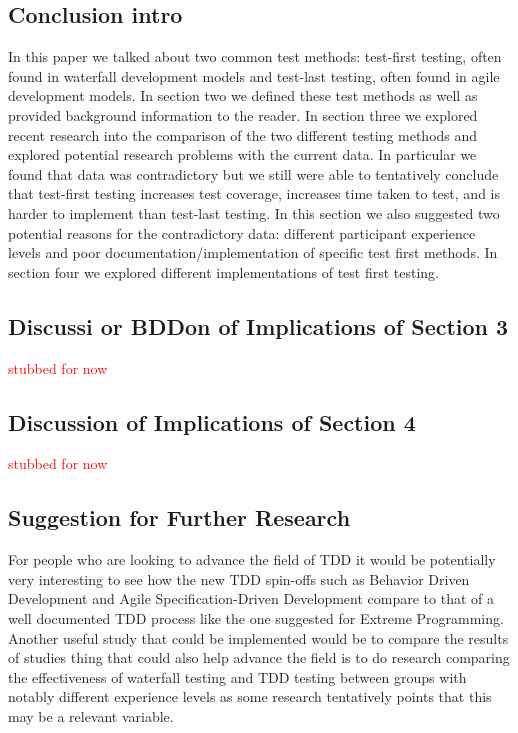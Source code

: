 \documentclass{sig-alternate}
\newcommand{\mycomment}[1]{\textcolor{red}{#1}}
\begin{document}
\subsection{Conclusion intro}

In this paper we talked about two common test methods: test-first testing, often found in waterfall development models and test-last testing, often found in agile development models.  In section two we defined these test methods as well as provided background information to the reader.  In section three we explored recent research into the comparison of the two different testing methods and explored potential research problems with the current data.  In particular we found that data was contradictory but we still were able to tentatively conclude that test-first testing increases test coverage, increases time taken to test, and is harder to implement than test-last testing.  In this section we also suggested two potential reasons for the contradictory data: different participant experience levels and poor documentation/implementation of specific test first methods. In section four we explored different implementations of test first testing.  

\subsection{Discussi or BDDon of Implications of Section 3}
\mycomment{stubbed for now}

\subsection{Discussion of Implications of Section 4}
\mycomment{stubbed for now}
\subsection{Suggestion for Further Research}
For people who are looking to advance the field of TDD it would be potentially very interesting to see how the new TDD spin-offs such as Behavior Driven Development and Agile Specification-Driven Development compare to that of a well documented TDD process like the one suggested for Extreme Programming.  Another useful study that could be implemented would be to compare the results of studies thing that could also help advance the field is to do research comparing the effectiveness of waterfall testing and TDD testing between groups with notably different experience levels as some research tentatively points that this may be a relevant variable.
\end{document}
